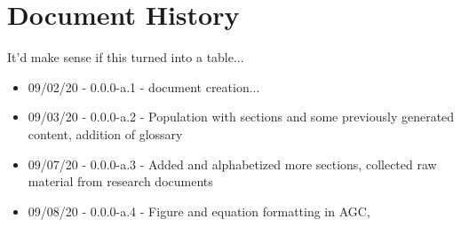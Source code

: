 \chapter{Document History}
It'd make sense if this turned into a table...

\begin{itemize}
\item 09/02/20 -  0.0.0-a.1 - document creation...
\item 09/03/20 -  0.0.0-a.2 - Population with sections and some previously generated content, addition of glossary
\item 09/07/20 - 0.0.0-a.3 - Added and alphabetized more sections, collected raw material from research documents
\item 09/08/20 - 0.0.0-a.4 - Figure and equation formatting in AGC,
\end{itemize}